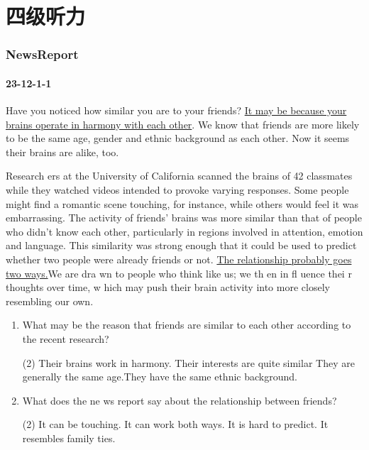 \part{四级听力}
\section{NewsReport}
\subsection{23-12-1-1}
\begin{margintable}\vspace{-2cm}\footnotesize
\end{margintable}
Have you noticed how similar you are to your friends? \uline{It may be because your brains operate in harmony with each other}. We know that friends are more likely to be the same age, gender and ethnic background as each other. Now it seems their brains are alike, too.

Research ers at the University of California scanned the brains of 42 classmates while they watched videos intended to provoke varying responses. Some people might find a romantic scene touching, for instance, while others would feel it was embarrassing. The activity of friends' brains was more similar than that of people who didn't know each other, particularly in regions involved in attention, emotion and language. This similarity was strong enough that it could be used to predict whether two people were already friends or not. \uline{The relationship probably goes two ways.}We are dra wn to people who think like us; we th en in fl uence thei r thoughts over time, w hich may push their brain activity into more closely resembling our own.

\begin{fullpage}
\begin{enumerate}
	\item What may be the reason that friends are similar to each other according to the recent research?
	\begin{tasks}(2)
		\task Their brains work in harmony.     \task Their interests are quite similar
		\task They are generally the same age.\task They have the same ethnic background.
	\end{tasks}
	\item What does the ne ws report say about the relationship between friends?
	\begin{tasks}(2)
		\task It can be touching.   \task It can work both ways.
		\task It is hard to predict. \task It resembles family ties.
	\end{tasks}
\end{enumerate}
\end{fullpage}



